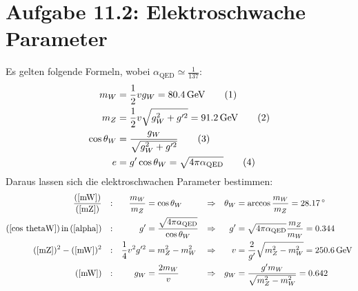 \documentclass[a4paper,12pt]{article}
\newcommand\numberthis{\addtocounter{equation}{1}\tag{\theequation}}
\newcommand{\tecxt}{}
\begin{document}
\section*{Aufgabe 11.2: Elektroschwache Parameter}
Es gelten folgende Formeln, wobei $\alpha_\tecxt\text{QED}\simeq\frac{1}{137}$:
\begin{align*}
m_W&=\frac{1}{2}vg_W=80.4\,\tecxt\text{GeV}\numberthis\label{mW}\\
m_Z&=\frac{1}{2}v\sqrt{g_W^2+g'^2}=91.2\,\tecxt\text{GeV}\numberthis\label{mZ}\\
\cos\theta_W&=\frac{g_W}{\sqrt{g_W^2+g'^2}}\numberthis\label{cos thetaW}\\
e&=g'\cos\theta_W=\sqrt{4\pi\alpha_\tecxt\text{QED}}\numberthis\label{alpha}
\end{align*}
Daraus lassen sich die elektroschwachen Parameter bestimmen:
\begin{align*}
\frac{(\ref{mW})}{(\ref{mZ})}&&:&&\frac{m_W}{m_Z}&=\cos\theta_W&\Rightarrow &&\theta_W&=\arccos\frac{m_W}{m_Z}=28.17\,\degree\\
(\ref{cos thetaW})\,\tecxt\text{in\,}(\ref{alpha})&&:&&g'&=\frac{\sqrt{4\pi\alpha_\tecxt\text{QED}}}{\cos\theta_W}&\Rightarrow &&g'&=\sqrt{4\pi\alpha_\tecxt\text{QED}}\frac{m_Z}{m_W}=0.344\\
(\ref{mZ})^2-(\ref{mW})^2&&:&&\frac{1}{4}v^2g'^2&=m_Z^2-m_W^2&\Rightarrow &&v&=\frac{2}{g'}\sqrt{m_Z^2-m_W^2}=250.6\,\tecxt\text{GeV}\\
(\ref{mW})&&:&&g_W&=\frac{2m_W}{v}&\Rightarrow &&g_W&=\frac{g'm_W}{\sqrt{m_Z^2-m_W^2}}=0.642
\end{align*}
\end{document}
